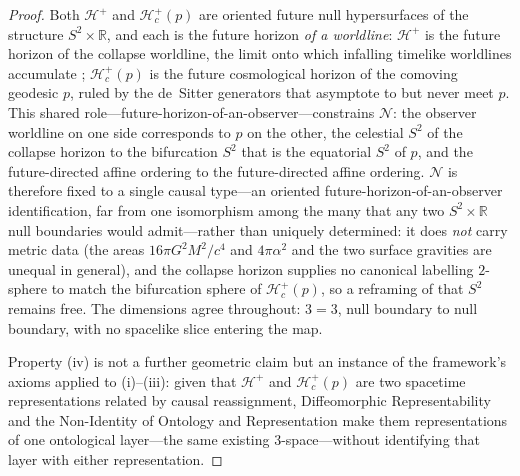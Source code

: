 \documentclass[11pt,a4paper]{article}
\theoremstyle{plain}
\theoremstyle{definition}
\theoremstyle{remark}
\begin{document}
\begin{proof}
Both $\mathcal{H}^+$ and $\mathcal{H}_c^{+}(p)$ are oriented future null hypersurfaces of the structure $S^2\times\mathbb{R}$, and each is the future horizon \emph{of a worldline}: $\mathcal{H}^+$ is the future horizon of the collapse worldline, the limit onto which infalling timelike worldlines accumulate \cite{JanzenBHcausality}; $\mathcal{H}_c^{+}(p)$ is the future cosmological horizon of the comoving geodesic $p$, ruled by the de~Sitter generators that asymptote to but never meet $p$. This shared role---future-horizon-of-an-observer---constrains $\mathcal{N}$: the observer worldline on one side corresponds to $p$ on the other, the celestial $S^2$ of the collapse horizon to the bifurcation $S^2$ that is the equatorial $S^2$ of $p$, and the future-directed affine ordering to the future-directed affine ordering. $\mathcal{N}$ is therefore fixed to a single causal type---an oriented future-horizon-of-an-observer identification, far from one isomorphism among the many that any two $S^2\times\mathbb{R}$ null boundaries would admit---rather than uniquely determined: it does \emph{not} carry metric data (the areas $16\pi G^2M^2/c^4$ and $4\pi\alpha^2$ and the two surface gravities are unequal in general), and the collapse horizon supplies no canonical labelling $2$-sphere to match the bifurcation sphere of $\mathcal{H}_c^{+}(p)$, so a reframing of that $S^2$ remains free. The dimensions agree throughout: $3=3$, null boundary to null boundary, with no spacelike slice entering the map.

Property (iv) is not a further geometric claim but an instance of the framework's axioms applied to (i)--(iii): given that $\mathcal{H}^+$ and $\mathcal{H}_c^{+}(p)$ are two spacetime representations related by causal reassignment, Diffeomorphic Representability and the Non-Identity of Ontology and Representation make them representations of one ontological layer---the same existing 3-space---without identifying that layer with either representation.


\end{proof}
\end{document}
